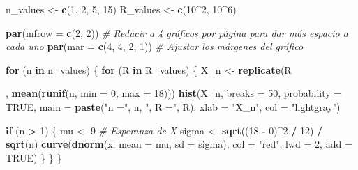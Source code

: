 \documentclass[
]{article}
\newenvironment{Shaded}{\begin{snugshade}}{\end{snugshade}}
\newcommand{\AttributeTok}[1]{\textcolor[rgb]{0.13,0.29,0.53}{#1}}
\newcommand{\CommentTok}[1]{\textcolor[rgb]{0.56,0.35,0.01}{\textit{#1}}}
\newcommand{\ConstantTok}[1]{\textcolor[rgb]{0.56,0.35,0.01}{#1}}
\newcommand{\ControlFlowTok}[1]{\textcolor[rgb]{0.13,0.29,0.53}{\textbf{#1}}}
\newcommand{\DecValTok}[1]{\textcolor[rgb]{0.00,0.00,0.81}{#1}}
\newcommand{\FunctionTok}[1]{\textcolor[rgb]{0.13,0.29,0.53}{\textbf{#1}}}
\newcommand{\NormalTok}[1]{#1}
\newcommand{\OtherTok}[1]{\textcolor[rgb]{0.56,0.35,0.01}{#1}}
\newcommand{\SpecialCharTok}[1]{\textcolor[rgb]{0.81,0.36,0.00}{\textbf{#1}}}
\newcommand{\StringTok}[1]{\textcolor[rgb]{0.31,0.60,0.02}{#1}}
\begin{document}
\begin{Shaded}
\begin{Highlighting}[]
\NormalTok{n\_values }\OtherTok{\textless{}{-}} \FunctionTok{c}\NormalTok{(}\DecValTok{1}\NormalTok{, }\DecValTok{2}\NormalTok{, }\DecValTok{5}\NormalTok{, }\DecValTok{15}\NormalTok{)}
\NormalTok{R\_values }\OtherTok{\textless{}{-}} \FunctionTok{c}\NormalTok{(}\DecValTok{10}\SpecialCharTok{\^{}}\DecValTok{2}\NormalTok{, }\DecValTok{10}\SpecialCharTok{\^{}}\DecValTok{6}\NormalTok{)}

\FunctionTok{par}\NormalTok{(}\AttributeTok{mfrow =} \FunctionTok{c}\NormalTok{(}\DecValTok{2}\NormalTok{, }\DecValTok{2}\NormalTok{))  }\CommentTok{\# Reducir a 4 gráficos por página para dar más espacio a cada uno}
\FunctionTok{par}\NormalTok{(}\AttributeTok{mar =} \FunctionTok{c}\NormalTok{(}\DecValTok{4}\NormalTok{, }\DecValTok{4}\NormalTok{, }\DecValTok{2}\NormalTok{, }\DecValTok{1}\NormalTok{))  }\CommentTok{\# Ajustar los márgenes del gráfico}

\ControlFlowTok{for}\NormalTok{ (n }\ControlFlowTok{in}\NormalTok{ n\_values) \{}
  \ControlFlowTok{for}\NormalTok{ (R }\ControlFlowTok{in}\NormalTok{ R\_values) \{}
\NormalTok{    X\_n }\OtherTok{\textless{}{-}} \FunctionTok{replicate}\NormalTok{(R}

\NormalTok{, }\FunctionTok{mean}\NormalTok{(}\FunctionTok{runif}\NormalTok{(n, }\AttributeTok{min =} \DecValTok{0}\NormalTok{, }\AttributeTok{max =} \DecValTok{18}\NormalTok{)))}
    \FunctionTok{hist}\NormalTok{(X\_n, }\AttributeTok{breaks =} \DecValTok{50}\NormalTok{, }\AttributeTok{probability =} \ConstantTok{TRUE}\NormalTok{,}
         \AttributeTok{main =} \FunctionTok{paste}\NormalTok{(}\StringTok{"n ="}\NormalTok{, n, }\StringTok{", R ="}\NormalTok{, R),}
         \AttributeTok{xlab =} \StringTok{"X\_n"}\NormalTok{, }\AttributeTok{col =} \StringTok{"lightgray"}\NormalTok{)}
    
    \ControlFlowTok{if}\NormalTok{ (n }\SpecialCharTok{\textgreater{}} \DecValTok{1}\NormalTok{) \{}
\NormalTok{      mu }\OtherTok{\textless{}{-}} \DecValTok{9}  \CommentTok{\# Esperanza de X}
\NormalTok{      sigma }\OtherTok{\textless{}{-}} \FunctionTok{sqrt}\NormalTok{((}\DecValTok{18} \SpecialCharTok{{-}} \DecValTok{0}\NormalTok{)}\SpecialCharTok{\^{}}\DecValTok{2} \SpecialCharTok{/} \DecValTok{12}\NormalTok{) }\SpecialCharTok{/} \FunctionTok{sqrt}\NormalTok{(n)  }
      \FunctionTok{curve}\NormalTok{(}\FunctionTok{dnorm}\NormalTok{(x, }\AttributeTok{mean =}\NormalTok{ mu, }\AttributeTok{sd =}\NormalTok{ sigma), }\AttributeTok{col =} \StringTok{"red"}\NormalTok{, }\AttributeTok{lwd =} \DecValTok{2}\NormalTok{, }\AttributeTok{add =} \ConstantTok{TRUE}\NormalTok{)}
\NormalTok{    \}}
\NormalTok{  \}}
\NormalTok{\}}
\end{Highlighting}
\end{Shaded}
\end{document}
